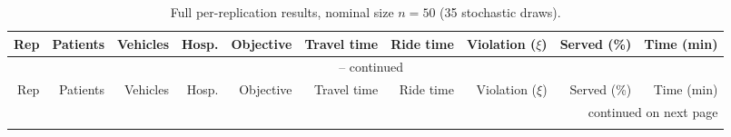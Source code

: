 \begingroup
\footnotesize
\setlength{\tabcolsep}{3pt}
\renewcommand{\arraystretch}{0.90}

\begin{longtable}{rrrrrrrrrr}
\caption{Full per-replication results, nominal size $n=50$ (35 stochastic draws).}
\label{tab:full-50} \\
\toprule
Rep & Patients & Vehicles & Hosp. & Objective & Travel time & Ride time & Violation ($\xi$) & Served (\%) & Time (min) \\
\midrule
\endfirsthead

\multicolumn{10}{c}{\tablename\ \thetable{} -- continued} \\
\toprule
Rep & Patients & Vehicles & Hosp. & Objective & Travel time & Ride time & Violation ($\xi$) & Served (\%) & Time (min) \\
\midrule
\endhead

\midrule
\multicolumn{10}{r}{continued on next page} \\
\endfoot

\bottomrule
\endlastfoot


\end{longtable}
